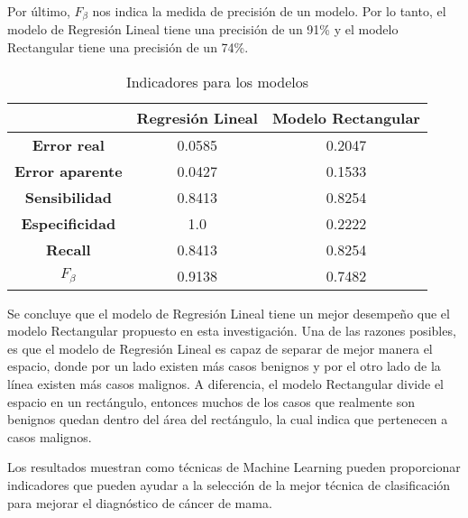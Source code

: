 \documentclass[conference]{IEEEtran}
\begin{document}
Por último, $F_{\beta}$ nos indica la medida de precisión de un modelo. Por lo tanto, el modelo de Regresión Lineal tiene una precisión de un 91\% y el modelo Rectangular tiene una precisión de un 74\%.

\begin{table}[H]
\caption{Indicadores para los modelos}
\label{table:IndicadoresModelos}
\begin{center}
\begin{tabular}{c|c|c|}
\cline{2-3}
                                              & \textbf{Regresión Lineal} & \textbf{Modelo Rectangular} \\ \hline
\multicolumn{1}{|c|}{\textbf{Error real}}     & 0.0585                    & 0.2047                      \\ \hline
\multicolumn{1}{|c|}{\textbf{Error aparente}} & 0.0427                    & 0.1533                      \\ \hline
\multicolumn{1}{|c|}{\textbf{Sensibilidad}}   & 0.8413                    & 0.8254                      \\ \hline
\multicolumn{1}{|c|}{\textbf{Especificidad}}  & 1.0                       & 0.2222                      \\ \hline
\multicolumn{1}{|c|}{\textbf{Recall}}         & 0.8413                    & 0.8254                      \\ \hline
\multicolumn{1}{|c|}{\textbf{$F_{\beta}$}}    & 0.9138                    & 0.7482                      \\ \hline
\end{tabular}
\end{center}
\end{table}

Se concluye que el modelo de Regresión Lineal tiene un mejor desempeño que el modelo Rectangular propuesto en esta investigación. Una de las razones posibles, es que el modelo de Regresión Lineal es capaz de separar de mejor manera el espacio, donde por un lado existen más casos benignos y por el otro lado de la línea existen más casos malignos. A diferencia, el modelo Rectangular divide el espacio en un rectángulo, entonces muchos de los casos que realmente son benignos quedan dentro del área del rectángulo, la cual indica que pertenecen a casos malignos. \newline

Los resultados muestran como técnicas de Machine Learning pueden proporcionar indicadores que pueden ayudar a la selección de la mejor técnica de clasificación para mejorar el diagnóstico de cáncer de mama. \newline
\end{document}
